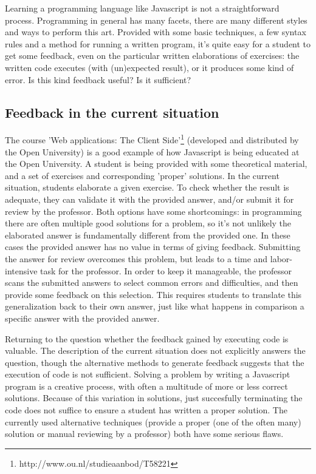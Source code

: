 \documentclass{article}
\begin{document}
Learning a programming language like Javascript is not a straightforward
process. Programming in general has many facets, there are many different
styles and ways to perform this art. Provided with some basic techniques, a few
syntax rules and a method for running a written program, it's quite easy for a
student to get some feedback, even on the particular written elaborations of
exercises: the written code executes (with (un)expected result), or it produces
some kind of error. Is this kind feedback useful? Is it sufficient?

\subsection{Feedback in the current situation}

The course 'Web applications: The Client
Side'\footnote{http://www.ou.nl/studieaanbod/T58221} (developed and distributed
by the Open University) is a good example of how Javascript is being educated
at the Open University. A student is being provided with some theoretical
material, and a set of exercises and corresponding 'proper' solutions. In the
current situation, students elaborate a given exercise. To check whether the
result is adequate, they can validate it with the provided answer, and/or
submit it for review by the professor. Both options have some shortcomings: in
programming there are often multiple good solutions for a problem, so it’s not
unlikely the elaborated answer is fundamentally different from the provided
one. In these cases the provided answer has no value in terms of giving
feedback. Submitting the answer for review overcomes this problem, but leads to
a time and labor-intensive task for the professor. In order to keep it
manageable, the professor scans the submitted answers to select common errors
and difficulties, and then provide some feedback on this selection. This
requires students to translate this generalization back to their own answer,
just like what happens in comparison a specific answer with the provided
answer.

Returning to the question whether the feedback gained by executing code is
valuable. The description of the current situation does not explicitly answers
the question, though the alternative methods to generate feedback suggests that
the execution of code is not sufficient. Solving a problem by writing a
Javascript program is a creative process, with often a multitude of more or
less correct solutions. Because of this variation in solutions, just
succesfully terminating the code does not suffice to ensure a student has
written a proper solution. The currently used alternative techniques (provide a
proper (one of the often many) solution or manual reviewing by a professor)
both have some serious flaws.
\end{document}
